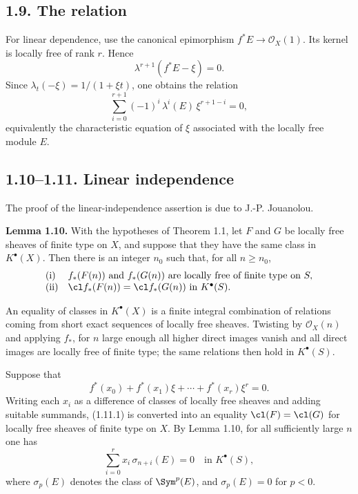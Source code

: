 \subsection*{1.9. The relation}
For linear dependence, use the canonical epimorphism \(f^*E\to\mathcal O_X(1)\). Its kernel is locally free of rank \(r\). Hence
\[
  \lambda^{r+1}(f^*E-\xi)=0.
\]
Since \(\lambda_t(-\xi)=1/(1+\xi t)\), one obtains the relation
\begin{equation}\tag{1.9.1}
  \sum_{i=0}^{r+1}(-1)^i\,\lambda^i(E)\,\xi^{r+1-i}=0,
\end{equation}
equivalently the characteristic equation of \(\xi\) associated with the locally free module \(E\).

\subsection*{1.10--1.11. Linear independence}
The proof of the linear-independence assertion is due to J.-P. Jouanolou.

\textbf{Lemma 1.10.} With the hypotheses of Theorem 1.1, let \(F\) and \(G\) be locally free sheaves of finite type on \(X\), and suppose that they have the same class in \(K^\bullet(X)\). Then there is an integer \(n_0\) such that, for all \(n\geq n_0\),
\[
\begin{array}{ll}
\text{\rm (i)}& f_*(F(n))\text{ and }f_*(G(n))\text{ are locally free of finite type on }S,\\
\text{\rm (ii)}& \cl f_*(F(n))=\cl f_*(G(n))\text{ in }K^\bullet(S).
\end{array}
\]

An equality of classes in \(K^\bullet(X)\) is a finite integral combination of relations coming from short exact sequences of locally free sheaves. Twisting by \(\mathcal O_X(n)\) and applying \(f_*\), for \(n\) large enough all higher direct images vanish and all direct images are locally free of finite type; the same relations then hold in \(K^\bullet(S)\).

Suppose that
\begin{equation}\tag{1.11.1}
  f^*(x_0)+f^*(x_1)\xi+\cdots+f^*(x_r)\xi^r=0 .
\end{equation}
Writing each \(x_i\) as a difference of classes of locally free sheaves and adding suitable summands, (1.11.1) is converted into an equality \(\cl(F)=\cl(G)\) for locally free sheaves of finite type on \(X\). By Lemma 1.10, for all sufficiently large \(n\) one has
\begin{equation}\tag{1.11.2}
  \sum_{i=0}^{r} x_i\,\sigma_{n+i}(E)=0
  \quad\text{in }K^\bullet(S),
\end{equation}
where \(\sigma_p(E)\) denotes the class of \(\Sym^p(E)\), and \(\sigma_p(E)=0\) for \(p<0\).

